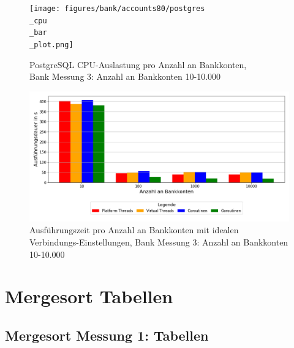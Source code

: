 \documentclass[fontsize=12pt,paper=a4,twoside=semi,parskip=half-,headsepline,headinclude]{scrreprt}
\begin{document}
\begin{figure}[H]
	\centering
	\texttt{[image: figures/bank/accounts80/postgres\\\_cpu\\\_bar\\\_plot.png]}
	\caption{PostgreSQL CPU-Auslastung pro Anzahl an Bankkonten,\\ Bank Messung 3: Anzahl an Bankkonten 10-10.000}
	\label{fig:bankAccounts80PostgCPU}
\end{figure}

\begin{figure}[H]
	\centering
	\includegraphics[scale=0.5]{figures/bank/accountsIdeal/execution_time_plot.png}
	\caption{Ausführungszeit pro Anzahl an Bankkonten mit idealen Verbindungs-Einstellungen, Bank Messung 3: Anzahl an Bankkonten 10-10.000}
	\label{fig:bankAccountsIdealZeit}
\end{figure}

\section{Mergesort Tabellen}

\subsection{Mergesort Messung 1: Tabellen}
\end{document}
